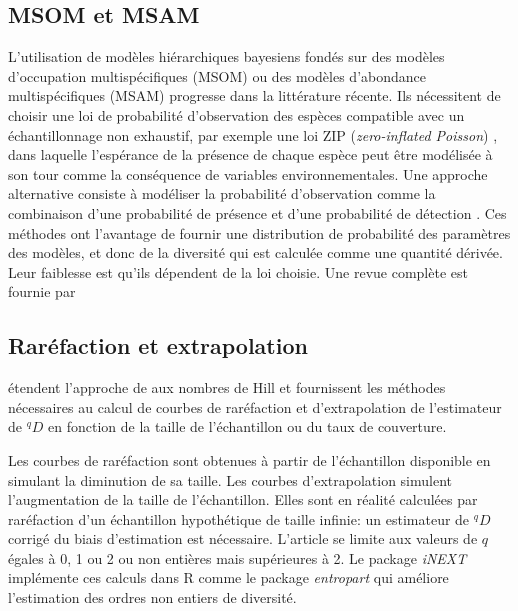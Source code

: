 \documentclass[
  11pt,
  french,
  a4paper,
  extrafontsizes,onecolumn,openright
  ]{memoir}
\begin{document}
\normalsize

\hypertarget{msom-et-msam}{%
\subsection{MSOM et MSAM}\label{msom-et-msam}}

L'utilisation de modèles hiérarchiques bayesiens fondés sur des modèles d'occupation multispécifiques (MSOM) ou des modèles d'abondance multispécifiques (MSAM) progresse dans la littérature récente.
Ils nécessitent de choisir une loi de probabilité d'observation des espèces compatible avec un échantillonnage non exhaustif, par exemple une loi ZIP (\emph{zero-inflated Poisson}) \autocite{Zhang2014c}, dans laquelle l'espérance de la présence de chaque espèce peut être modélisée à son tour comme la conséquence de variables environnementales.
Une approche alternative consiste à modéliser la probabilité d'observation comme la combinaison d'une probabilité de présence et d'une probabilité de détection \autocite{Broms2014}.
Ces méthodes ont l'avantage de fournir une distribution de probabilité des paramètres des modèles, et donc de la diversité qui est calculée comme une quantité dérivée. Leur faiblesse est qu'ils dépendent de la loi choisie. Une revue complète est fournie par \textcite{Iknayan2014}

\hypertarget{sec-RarExtrapol}{%
\subsection{Raréfaction et extrapolation}\label{sec-RarExtrapol}}

\textcite{Chao2014} étendent l'approche de \textcite{Gotelli2001} aux nombres de Hill et fournissent les méthodes nécessaires au calcul de courbes de raréfaction et d'extrapolation de l'estimateur de \(^{q}\!D\) en fonction de la taille de l'échantillon ou du taux de couverture.

Les courbes de raréfaction sont obtenues à partir de l'échantillon disponible en simulant la diminution de sa taille.
Les courbes d'extrapolation simulent l'augmentation de la taille de l'échantillon.
Elles sont en réalité calculées par raréfaction d'un échantillon hypothétique de taille infinie: un estimateur de \(^{q}\!D\) corrigé du biais d'estimation est nécessaire.
L'article se limite aux valeurs de \(q\) égales à 0, 1 ou 2 ou non entières mais supérieures à 2.
Le package \emph{iNEXT} \autocite{Hsieh2014} implémente ces calculs dans R comme le package \emph{entropart} qui améliore l'estimation des ordres non entiers de diversité.
\end{document}
